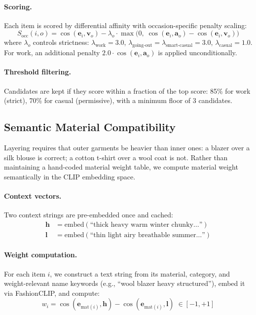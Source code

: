 \documentclass[10pt,twocolumn]{article}
\begin{document}
\paragraph{Scoring.}
Each item is scored by differential affinity with occasion-specific penalty
scaling:
\begin{equation}
  S_{\text{occ}}(i, o) = \cos(\mathbf{e}_i, \mathbf{v}_o) -
    \lambda_o \cdot \max\!\big(0,\;
    \cos(\mathbf{e}_i, \mathbf{a}_o) - \cos(\mathbf{e}_i, \mathbf{v}_o)\big)
\label{eq:occasion}
\end{equation}
where $\lambda_o$ controls strictness: $\lambda_{\text{work}} = 3.0$,
$\lambda_{\text{going-out}} = \lambda_{\text{smart-casual}} = 3.0$,
$\lambda_{\text{casual}} = 1.0$.
For work, an additional penalty $2.0 \cdot \cos(\mathbf{e}_i, \mathbf{a}_o)$
is applied unconditionally.

\paragraph{Threshold filtering.}
Candidates are kept if they score within a fraction of the top score:
85\% for work (strict), 70\% for casual (permissive), with a minimum floor
of 3 candidates.

\subsection{Semantic Material Compatibility}
\label{sec:material}

Layering requires that outer garments be heavier than inner ones: a blazer
over a silk blouse is correct; a cotton t-shirt over a wool coat is not.
Rather than maintaining a hand-coded material weight table, we compute
material weight semantically in the CLIP embedding space.

\paragraph{Context vectors.}
Two context strings are pre-embedded once and cached:
\begin{align}
  \mathbf{h} &= \text{embed}(\text{``thick heavy warm winter chunky\ldots''}) \\
  \mathbf{l} &= \text{embed}(\text{``thin light airy breathable summer\ldots''})
\end{align}

\paragraph{Weight computation.}
For each item $i$, we construct a text string from its material, category,
and weight-relevant name keywords (e.g., ``wool blazer heavy structured''),
embed it via FashionCLIP, and compute:
\begin{equation}
  w_i = \cos(\mathbf{e}_{\text{mat}(i)}, \mathbf{h}) -
    \cos(\mathbf{e}_{\text{mat}(i)}, \mathbf{l})
  \;\in [-1, +1]
\label{eq:material_weight}
\end{equation}
\end{document}
